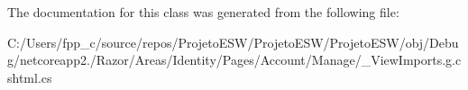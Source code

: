 The documentation for this class was generated from the following file\+:\begin{DoxyCompactItemize}
\item 
C\+:/\+Users/fpp\+\_\+c/source/repos/\+Projeto\+E\+S\+W/\+Projeto\+E\+S\+W/\+Projeto\+E\+S\+W/obj/\+Debug/netcoreapp2./\+Razor/\+Areas/\+Identity/\+Pages/\+Account/\+Manage/\+\_\+\+View\+Imports.\+g.\+cshtml.\+cs\end{DoxyCompactItemize}
